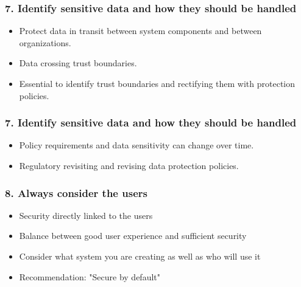 \documentclass[12pt,norsk]{beamer}
\begin{document}
\begin{frame}

	\frametitle{7. Identify sensitive data and how they should be handled}
	\begin{itemize}

		\item Protect data in transit between system components and between organizations.
		\item Data crossing trust boundaries.
		\item Essential to identify trust boundaries and rectifying them with protection policies.
		
		
		
	\end{itemize}
	

\end{frame}


\begin{frame}

	\frametitle{7. Identify sensitive data and how they should be handled}
	\begin{itemize}

		\item Policy requirements and data sensitivity can change over time.
		\item Regulatory revisiting and revising data protection policies.		
		
	\end{itemize}
	

\end{frame}

\begin{frame}

	\frametitle{8. Always consider the users}
	
	\begin{itemize}
	
		\item Security directly linked to the users
		\item Balance between good user experience and sufficient security
		\item Consider what system you are creating as well as who will use it
		\item Recommendation: "Secure by default"
		\end{itemize}
\end{frame}
\end{document}
